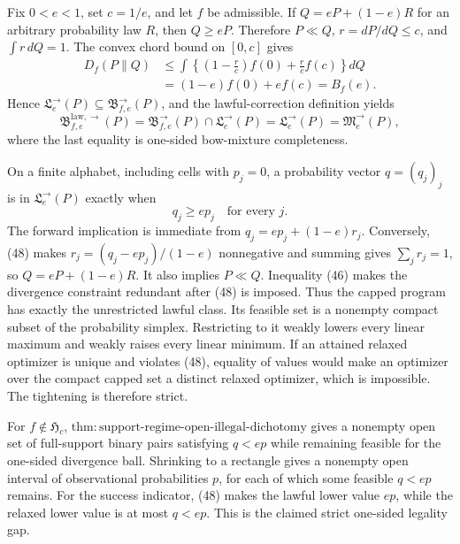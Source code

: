 Fix \(0<e<1\), set \(c=1/e\), and let \(f\) be admissible.  If \(Q=eP+(1-e)R\) for an arbitrary probability law \(R\), then \(Q\ge eP\).  Therefore \(P\ll Q\), \(r=dP/dQ\le c\), and \(\int r\,dQ=1\).  The convex chord bound on \([0,c]\) gives
\[
 \begin{aligned}
 D_f(P\|Q)
 &\le\int\left\{\left(1-\frac rc\right)f(0)+\frac rc f(c)\right\}dQ\\
 &=(1-e)f(0)+ef(c)=B_f(e).
 \end{aligned} \tag{46}
\]
Hence \(\mathfrak L^{\to}_e(P)\subseteq\mathfrak B^{\to}_{f,e}(P)\), and the lawful-correction definition yields
\[
 \mathfrak B^{\mathrm{law},\to}_{f,e}(P)
 =\mathfrak B^{\to}_{f,e}(P)\cap\mathfrak L^{\to}_e(P)
 =\mathfrak L^{\to}_e(P)=\mathfrak M^{\to}_e(P), \tag{47}
\]
where the last equality is one-sided bow-mixture completeness.

On a finite alphabet, including cells with \(p_j=0\), a probability vector \(q=(q_j)_j\) is in \(\mathfrak L^{\to}_e(P)\) exactly when
\[
 q_j\ge ep_j\quad\text{for every }j. \tag{48}
\]
The forward implication is immediate from \(q_j=ep_j+(1-e)r_j\).  Conversely, (48) makes \(r_j=(q_j-ep_j)/(1-e)\) nonnegative and summing gives \(\sum_jr_j=1\), so \(Q=eP+(1-e)R\).  It also implies \(P\ll Q\).  Inequality (46) makes the divergence constraint redundant after (48) is imposed.  Thus the capped program has exactly the unrestricted lawful class.  Its feasible set is a nonempty compact subset of the probability simplex.  Restricting to it weakly lowers every linear maximum and weakly raises every linear minimum.  If an attained relaxed optimizer is unique and violates (48), equality of values would make an optimizer over the compact capped set a distinct relaxed optimizer, which is impossible.  The tightening is therefore strict.

For \(f\notin\mathfrak H_c\), \(\mathrm{thm:support\text{-}regime\text{-}open\text{-}illegal\text{-}dichotomy}\) gives a nonempty open set of full-support binary pairs satisfying \(q<ep\) while remaining feasible for the one-sided divergence ball.  Shrinking to a rectangle gives a nonempty open interval of observational probabilities \(p\), for each of which some feasible \(q<ep\) remains.  For the success indicator, (48) makes the lawful lower value \(ep\), while the relaxed lower value is at most \(q<ep\).  This is the claimed strict one-sided legality gap.
